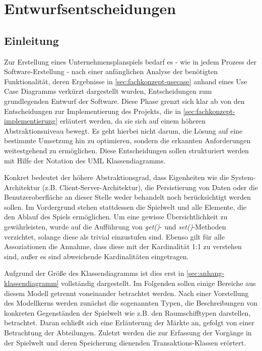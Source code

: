 \section{Entwurfsentscheidungen}
\label{sec:fachkonzept-entwurf}


\subsection{Einleitung}
Zur Erstellung eines Unternehmensplanspiels bedarf es - wie in jedem Prozess der Software-Erstellung - nach einer anfänglichen Analyse der benötigten Funktionalität, deren Ergebnisse in \ref{sec:fachkonzept-usecase} anhand eines Use Case Diagramms verkürzt dargestellt wurden, Entscheidungen zum grundlegenden Entwurf der Software. Diese Phase grenzt sich klar ab von den Entscheidungen zur Implementierung des Projekts, die in \ref{sec:fachkonzept-implementierung} erläutert werden, da sie sich auf einem höheren Abstraktionsniveau bewegt. Es geht hierbei nicht darum, die Lösung auf eine bestimmte Umsetzung hin zu optimieren, sondern die erkannten Anforderungen weitestgehend zu ermöglichen. Diese Entscheidungen sollen strukturiert werden mit Hilfe der Notation des UML Klassendiagramms.

Konkret bedeutet der höhere Abstraktionsgrad, dass Eigenheiten wie die System-Architektur (z.B. Client-Server-Architektur), die Persistierung von Daten oder die Benutzeroberfläche an dieser Stelle weder behandelt noch berücksichtigt werden sollen. Im Vordergrund stehen stattdessen die Spielwelt und alle Elemente, die den Ablauf des Spiels ermöglichen. Um eine gewisse Übersichtlichkeit zu gewährleisten, wurde auf die Aufführung von \textit{get()}- und \textit{set()}-Methoden verzichtet, solange diese als trivial einzustufen sind. Ebenso gilt für alle Assoziationen die Annahme, dass diese mit der Kardinalität 1:1 zu verstehen sind, außer es sind abweichende Kardinalitäten eingetragen.

Aufgrund der Größe des Klassendiagramms ist dies erst in \vref{sec:anhang-klassendiagramm} vollständig dargestellt. Im Folgenden sollen einige Bereiche aus diesem Modell getrennt voneinander betrachtet werden. Nach einer Vorstellung des Modellkerns werden zunächst die sogenannten Typen, die Beschreibungen von konkreten Gegenständen der Spielwelt wie z.B. den Raumschifftypen darstellen, betrachtet. Daran schließt sich eine Erläuterung der Märkte an, gefolgt von einer Betrachtung der Abteilungen. Zuletzt werden die zur Erfassung der Vorgänge in der Spielwelt und deren Speicherung dienenden Transaktions-Klassen erörtert.

